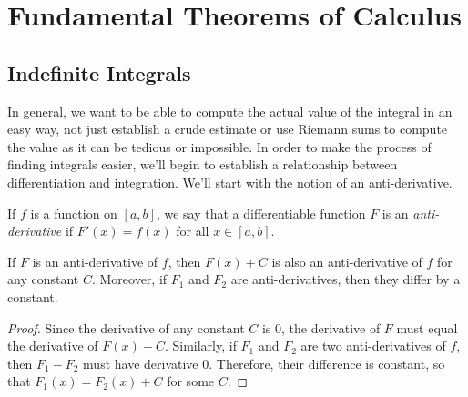 \section{Fundamental Theorems of Calculus}











\subsection{Indefinite Integrals}


In general, we want to be able to compute the actual value of the integral in an easy way, not just establish a crude estimate or use Riemann sums to compute the value as it can be tedious or impossible. In order to make the process of finding integrals easier, we'll begin to establish a relationship between differentiation and integration. We'll start with the notion of an anti-derivative.
\begin{defn}
If $f$ is a function on $[a,b]$, we say that a differentiable function $F$ is an \emph{anti-derivative} if $F'(x)=f(x)$ for all $x\in [a,b]$.
\end{defn}
\begin{prop}\label{PlusC}
  If $F$ is an anti-derivative of $f$, then $F(x)+C$ is also an anti-derivative of $f$ for any constant $C$. Moreover, if $F_1$ and $F_2$ are anti-derivatives, then they differ by a constant.
\end{prop}
\begin{proof}
  Since the derivative of any constant $C$ is $0$, the derivative of $F$ must equal the derivative of $F(x)+C$. Similarly, if $F_1$ and $F_2$ are two anti-derivatives of $f$, then $F_1-F_2$ must have derivative 0. Therefore, their difference is constant, so that $F_1(x)=F_2(x)+C$ for some $C$.
\end{proof}

